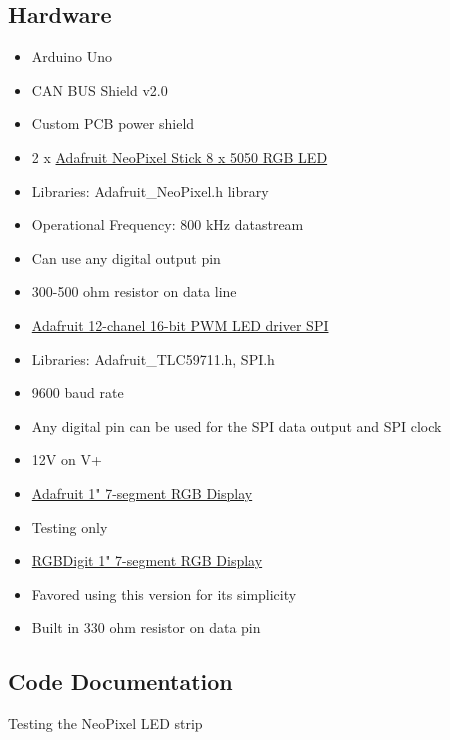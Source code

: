\documentclass[11pt]{article}
\begin{document}
    \subsection{\texorpdfstring{\textbf{Hardware}}{Hardware}}\label{hardware}

\begin{itemize}
\item
  Arduino Uno
\item
  CAN BUS Shield v2.0
\item
  Custom PCB power shield
\item
  2 x \href{https://www.adafruit.com/product/1426}{Adafruit NeoPixel
  Stick 8 x 5050 RGB LED}
\item
  Libraries: Adafruit\_NeoPixel.h library
\item
  Operational Frequency: 800 kHz datastream
\item
  Can use any digital output pin
\item
  300-500 ohm resistor on data line
\item
  \href{https://www.adafruit.com/product/1455}{Adafruit 12-chanel 16-bit
  PWM LED driver SPI}
\item
  Libraries: Adafruit\_TLC59711.h, SPI.h
\item
  9600 baud rate
\item
  Any digital pin can be used for the SPI data output and SPI clock
\item
  12V on V+
\item
  \href{https://www.adafruit.com/product/1399}{Adafruit 1" 7-segment RGB
  Display}
\item
  Testing only
\item
  \href{https://www.rgbdigit.com/shop/index.php?id_product=8\&controller=product\&id_lang=1}{RGBDigit
  1" 7-segment RGB Display}
\item
  Favored using this version for its simplicity
\item
  Built in 330 ohm resistor on data pin
\end{itemize}

    \subsection{\texorpdfstring{\textbf{Code
Documentation}}{Code Documentation}}\label{code-documentation}

Testing the NeoPixel LED strip
\end{document}
